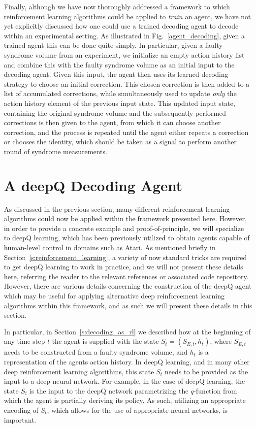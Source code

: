 \documentclass[twocolumn,preprintnumbers,amsmath,amssymb,notitlepage,nofootinbib,longbibliography,superscriptaddress,aps,pra,10pt]{revtex4-1}
\begin{document}
	Finally, although we have now thoroughly addressed a framework to which reinforcement learning algorithms could be applied to \textit{train} an agent, we have not yet explicitly discussed how one could use a trained decoding agent to decode within an experimental setting.
	As illustrated in Fig.~\ref{agent_decoding}, given a trained agent this can be done quite simply.
	In particular, given a faulty syndrome volume from an experiment, we initialize an empty action history list and combine this with the faulty syndrome volume as an initial input to the decoding agent.
	Given this input, the agent then uses its learned decoding strategy to choose an initial correction.
	This chosen correction is then added to a list of accumulated corrections, while simultaneously used to update \textit{only} the action history element of the previous input state.
	This updated input state, containing the original syndrome volume and the subsequently performed corrections is then given to the agent, from which it can choose another correction, and the process is repeated until the agent either repeats a correction or chooses the identity, which should be taken as a signal to perform another round of syndrome measurements.

\section{A deepQ Decoding Agent}\label{s:dq_agent}

	As discussed in the previous section, many different reinforcement learning algorithms could now be applied within the framework presented here. 
	However, in order to provide a concrete example and proof-of-principle, we will specialize to deepQ learning, which has been previously utilized to obtain agents capable of human-level control in domains such as Atari.
	As mentioned briefly in Section~\ref{s:reinforcement_learning}, a variety of now standard tricks are required to get deepQ learning to work in practice, and we will not present these details here, referring the reader to the relevant references or associated code repository.
	However, there are various details concerning the construction of the deepQ agent which may be useful for applying alternative deep reinforcement learning algorithms within this framework, and as such we will present these details in this section.

	In particular, in Section~\ref{s:decoding_as_rl} we described how at the beginning of any time step $t$ the agent is supplied with the state $S_{t}=(S_{E,{t}},h_{t})$, where $S_{E,{t}}$ needs to be constructed from a faulty syndrome volume, and $h_{t}$ is a representation of the agents action history.
	In deepQ learning, and in many other deep reinforcement learning algorithms, this state $S_t$ needs to be provided as the input to a deep neural network.
	For example, in the case of deepQ learning, the state $S_t$ is the input to the deepQ network parametrizing the $q$-function from which the agent is partially deriving its policy.
	As such, utilizing an appropriate encoding of $S_t$, which allows for the use of appropriate neural networks, is important.
\end{document}
